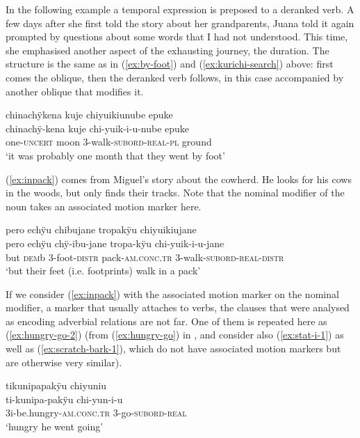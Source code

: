 In the following example a temporal expression is preposed to a deranked verb. A few days after she first told the story about her grandparents, Juana told it again prompted by questions about some words that I had not understood. This time, she emphasised another aspect of the exhausting journey, the duration. The structure is the same as in (\ref{ex:by-foot}) and (\ref{ex:kurichi-search}) above: first comes the oblique, then the deranked verb follows, in this case accompanied by another oblique that modifies it.

\ea\label{ex:SUBORD-INTRO}
\begingl 
\glpreamble chinachÿkena kuje chiyuikiunube epuke\\
\gla chinachÿ-kena kuje chi-yuik-i-u-nube epuke\\ 
\glb one-\textsc{uncert} moon 3-walk-\textsc{subord}-\textsc{real}-\textsc{pl} ground\\ 
\glft ‘it was probably one month that they went by foot’
\trailingcitation{[jxx-e150925l-1.196]}
\xe


(\ref{ex:inpack}) comes from Miguel’s story about the cowherd. He looks for his cows in the woods, but only finds their tracks. Note that the nominal modifier of the noun takes an associated motion marker here.

\ea\label{ex:inpack}
\begingl
\glpreamble pero echÿu chibujane tropakÿu chiyuikiujane \\
\gla pero echÿu chÿ-ibu-jane tropa-kÿu chi-yuik-i-u-jane \\ 
\glb but \textsc{dem}b 3-foot-\textsc{distr} pack-\textsc{am.conc.tr} 3-walk-\textsc{subord}-\textsc{real}-\textsc{distr} \\ 
\glft ‘but their feet (i.e. footprints) walk in a pack’
\trailingcitation{[mxx-n151017l-1.19]}
\xe

If we consider (\ref{ex:inpack}) with the associated motion marker on the nominal modifier, a marker that usually attaches to verbs, the clauses that were analysed as encoding adverbial relations are not far. One of them is repeated here as  (\ref{ex:hungry-go-2}) (from (\ref{ex:hungry-go}) in , and consider also (\ref{ex:stat-i-1}) as well as (\ref{ex:scratch-bark-1}), which do not have associated motion markers but are otherwise very similar).


\ea\label{ex:hungry-go-2}
\begingl
\glpreamble tikunipapakÿu chiyuniu\\
\gla ti-kunipa-pakÿu chi-yun-i-u\\
\glb 3i-be.hungry-\textsc{am.conc.tr} 3-go-\textsc{subord}-\textsc{real}\\
\glft ‘hungry he went going’
\endgl
\trailingcitation{[jmx-n120429ls-x5.222]}
\xe

